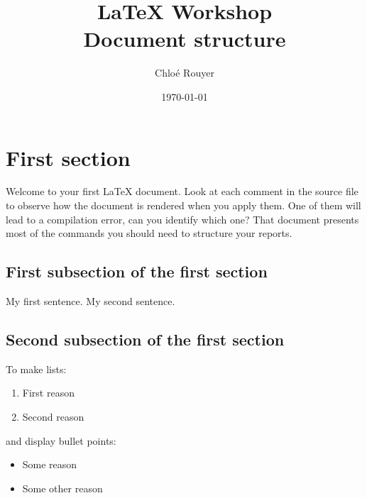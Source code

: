 \documentclass{article}
\author{Chloé Rouyer}
\title{\LARGE{\LaTeX{} Workshop}\\
	\large{Document structure}
}
\date{\today}
\begin{document}
	\maketitle
	
	\tableofcontents
	
	\newpage
	

	
	\section{First section}
	\label{sec:introduction}
		Welcome to your first \LaTeX{} document. Look at each comment in the source file to observe how the document is rendered when you apply them. One of them will lead to a compilation error, can you identify which one?
		That document presents most of the commands you should need to structure your reports.
		\subsection{First subsection of the first section}
			
			My first sentence.
			My   second   sentence.
			
		\subsection{Second subsection of the first section}
		
		To make lists:
		\begin{enumerate}
			\item First reason
			\item Second reason
		\end{enumerate}
		and display bullet points:
		
		\begin{itemize}
			\item Some reason
			\item Some other reason
		\end{itemize}
	
\end{document}
